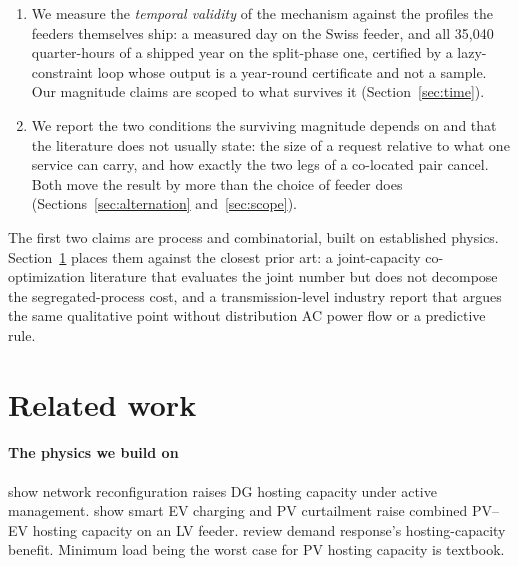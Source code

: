 \documentclass[review,authoryear,12pt]{elsarticle}
\begin{document}
\begin{enumerate}
    (Section~\ref{sec:blind}). We tie the loss of guarantees to the breakdown
    of the independence-system structure that justifies serial,
    first-come, first-served processing in the first place
    (Section~\ref{sec:theory-gs}).
  \item We measure the \emph{temporal validity} of the mechanism against the
    profiles the feeders themselves ship: a measured day on the Swiss
    feeder, and all 35{,}040 quarter-hours of a shipped year on the
    split-phase one, certified by a lazy-constraint loop whose output is a
    year-round certificate and not a sample. Our magnitude claims are scoped
    to what survives it (Section~\ref{sec:time}).
  \item We report the two conditions the surviving magnitude depends on and
    that the literature does not usually state: the size of a request
    relative to what one service can carry, and how exactly the two legs of a
    co-located pair cancel. Both move the result by more than the choice of
    feeder does (Sections~\ref{sec:alternation} and~\ref{sec:scope}).
\end{enumerate}
The first two claims are process and combinatorial, built on established
physics. Section~\ref{sec:related} places them against the closest prior art:
a joint-capacity co-optimization literature that evaluates the joint number
but does not decompose the segregated-process cost, and a transmission-level
industry report that argues the same qualitative point without distribution
AC power flow or a predictive rule.

\section{Related work}
\label{sec:related}

\paragraph{The physics we build on}
\citet{capitanescu2015} show network reconfiguration raises DG hosting
capacity under active management. \citet{fachrizal2021} show smart EV
charging and PV curtailment raise combined PV--EV hosting capacity on an LV
feeder. \citet{hwang2023} review demand response's hosting-capacity benefit.
Minimum load being the worst case for PV hosting capacity is textbook.
\end{document}
